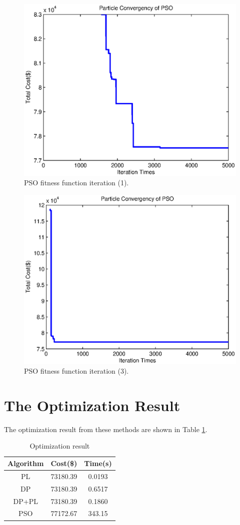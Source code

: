 \documentclass[a4paper, 12pt, notitlepage]{report}
\begin{document}
\begin{figure}
\centering
\includegraphics[height=0.6\textwidth]{9.eps}
\caption{PSO fitness function iteration (1).}
\label{Figure3}
\end{figure}

\begin{figure}
\centering
\includegraphics[height=0.6\textwidth]{10.eps}
\caption{PSO fitness function iteration (3).}
\label{Figure4}
\end{figure}

\clearpage


\clearpage
\section{The Optimization Result}
The optimization result from these methods are shown in Table \ref{table:table4}.
\begin{table}
\centering
\begin{tabular}{ | c | c | c | }
\hline
Algorithm & Cost(\$)  & Time(s)\\
\hline
PL    & 73180.39  & 0.0193\\
\hline
DP    & 73180.39  & 0.6517\\
\hline
DP+PL & 73180.39  & 0.1860\\
\hline
PSO   & 77172.67  & 343.15\\
\hline
\end{tabular}
\caption{Optimization result}
\label{table:table4}
\end{table}
\end{document}
